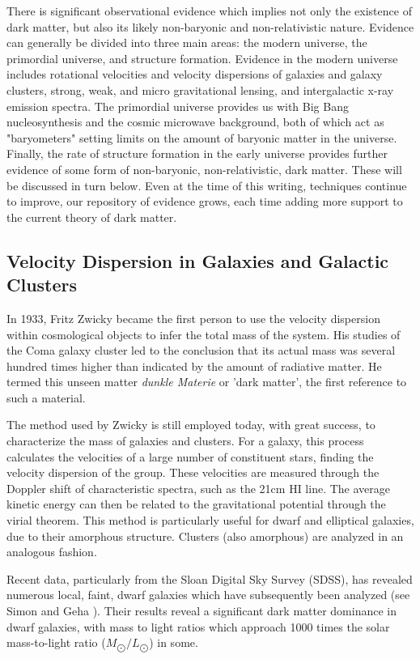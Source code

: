 \documentclass{report}
\begin{document}
There is significant observational evidence which implies not only the existence of dark matter, but also its likely non-baryonic and non-relativistic nature. Evidence can generally be divided into three main areas: the modern universe, the primordial universe, and structure formation. Evidence in the modern universe includes rotational velocities and velocity dispersions of galaxies and galaxy clusters, strong, weak, and micro gravitational lensing, and intergalactic x-ray emission spectra. The primordial universe provides us with Big Bang nucleosynthesis and the cosmic microwave background, both of which act as "baryometers" setting limits on the amount of baryonic matter in the universe. Finally, the rate of structure formation in the early universe provides further evidence of some form of non-baryonic, non-relativistic, dark matter. These will be discussed in turn below. Even at the time of this writing, techniques continue to improve, our repository of evidence grows, each time adding more support to the current theory of dark matter.

\subsection{Velocity Dispersion in Galaxies and Galactic Clusters}

In 1933, Fritz Zwicky became the first person to use the velocity dispersion within cosmological objects to infer the total mass of the system. His studies of the Coma galaxy cluster led to the conclusion that its actual mass was several hundred times higher than indicated by the amount of radiative matter. He termed this unseen matter \emph{dunkle Materie} or 'dark matter', the first reference to such a material.

The method used by Zwicky is still employed today, with great success, to characterize the mass of galaxies and clusters. For a galaxy, this process calculates the velocities of a large number of constituent stars, finding the velocity dispersion of the group. These velocities are measured through the Doppler shift of characteristic spectra, such as the 21cm HI line. The average kinetic energy can then be related to the gravitational potential through the virial theorem. This method is particularly useful for dwarf and elliptical galaxies, due to their amorphous structure. Clusters (also amorphous) are analyzed in an analogous fashion.

Recent data, particularly from the Sloan Digital Sky Survey (SDSS), has revealed numerous local, faint, dwarf galaxies which have subsequently been analyzed (see Simon and Geha \cite{Simon2007}). Their results reveal a significant dark matter dominance in dwarf galaxies, with mass to light ratios which approach 1000 times the solar mass-to-light ratio ($M_{\bigodot}/L_{\bigodot}$) in some. %
\end{document}
